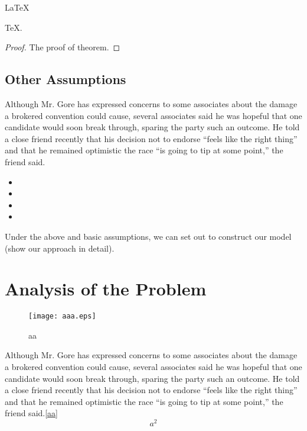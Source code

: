     \begin{Theorem} \label{thm:latex}
    \LaTeX
    \end{Theorem}
    \begin{Lemma} \label{thm:tex}
    \TeX .
    \end{Lemma}
    \begin{proof}
    The proof of theorem.
    \end{proof}






\subsection{Other Assumptions}
Although Mr. Gore has expressed concerns to some associates about
the damage a brokered convention could cause, several associates
said he was hopeful that one candidate would soon break through,
sparing the party such an outcome. He told a close friend recently
that his decision not to endorse ``feels like the right thing''
and that he remained optimistic the race ``is going to tip at some
point,'' the friend said.
\begin{itemize}
\item
\item
\item
\item
\end{itemize}

 Under the above and basic assumptions, we can set out
to construct our model (show our approach in detail).
\section{Analysis of the Problem }
\begin{figure}[h]
\small
\centering
\texttt{[image: aaa.eps]}
\caption{aa} \label{fig:aa}
\end{figure}

Although Mr. Gore has expressed concerns to some associates about
the damage a brokered convention could cause, several associates
said he was hopeful that one candidate would soon break through,
sparing the party such an outcome. He told a close friend recently
that his decision not to endorse ``feels like the right thing''
and that he remained optimistic the race ``is going to tip at some
point,'' the friend said.\eqref{aa}
\begin{equation}
  a^2 \label{aa}
\end{equation}


